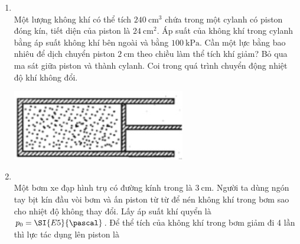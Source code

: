 \begin{enumerate}[label=\bfseries Câu \arabic*:, leftmargin=1.7cm]
\item {}\\
Một lượng không khí có thể tích $\SI{240}{\centi\meter^3}$ chứa trong một cylanh có piston đóng kín, tiết diện của piston là $\SI{24}{\centi\meter^2}$. Áp suất của không khí trong cylanh bằng áp suất không khí bên ngoài và bằng $\SI{100}{\kilo\pascal}$. Cần một lực bằng bao nhiêu để dịch chuyển piston $\SI{2}{\centi\meter}$ theo chiều làm thể tích khí giảm? Bỏ qua ma sát giữa piston và thành cylanh. Coi trong quá trình chuyển động nhiệt độ khí không đổi.
\begin{center}
	\includegraphics[width=0.25\linewidth]{../figs/VN12-Y24-PH-SYL-010P-3}
\end{center}

\item {}\\
Một bơm xe đạp hình trụ có đường kính trong là $\SI{3}{\centi\meter}$. Người ta dùng ngón tay bịt kín đầu vòi bơm và ấn piston từ từ để nén không khí trong bơm sao cho nhiệt độ không thay đổi. Lấy áp suất khí quyển là $p_0=\SI{E5}{\pascal}$. Để thể tích của không khí trong bơm giảm đi 4 lần thì lực tác dụng lên piston là


\end{enumerate}
